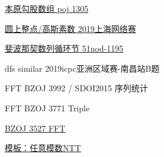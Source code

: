 




\vbox{}

\vbox{}

\begin{problemset}
	\item \href{http://poj.org/problem?id=1305}{本原勾股数组 \quad poj 1305}
	\item \href{https://nanti.jisuanke.com/t/41421}{圆上整点/高斯素数 \quad 2019上海网络赛}
	\item \href{https://www.51nod.com/Challenge/Problem.html#problemId=1195}{斐波那契数列循环节 \quad 51nod-1195}
	\item dfs similar \quad 2019icpc亚洲区域赛-南昌站B题
	\item FFT \quad BZOJ 3992 / SDOI2015 序列统计
	\item FFT \quad BZOJ 3771 Triple
	\item \href{https://www.lydsy.com/JudgeOnline/problem.php?id=3527}{BZOJ 3527 \quad FFT}
	\item \href{https://www.luogu.com.cn/problem/P4245}{模板：任意模数NTT}
\end{problemset}


\nocite{*} 

